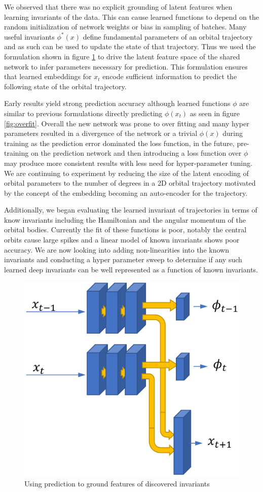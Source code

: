 \documentclass[10pt,letterpaper]{report}
\author{Brandon Houghton}
\begin{document}
We observed that there was no explicit grounding of latent features when learning invariants of the data. This can cause learned functions to depend on the random initialization of network weights or bias in sampling of batches. Many useful invariants $\phi^*(x)$ define fundamental parameters of an orbital trajectory and as such can be used to update the state of that trajectory. Thus we used the formulation shown in figure \ref{fig:prednetwork} to drive the latent feature space of the shared network to infer parameters necessary for prediction. This formulation ensures that learned embeddings for $x_t$ encode sufficient information to predict the following state of the orbital trajectory.

Early results yield strong prediction accuracy although learned functions $\phi$ are similar to previous formulations directly predicting $\phi (x_t)$ as seen in figure \ref{fig:overfit}. Overall the new network was prone to over fitting and many hyper parameters resulted in a divergence of the network or a trivial $\phi(x)$ during training as the prediction error dominated the loss function, in the future, pre-training on the prediction network and then introducing a loss function over $\phi$ may produce more consistent results with less need for hyper-parameter tuning. We are continuing to experiment by reducing the size of the latent encoding of orbital parameters to the number of degrees in a 2D orbital trajectory motivated by the concept of the embedding becoming an auto-encoder for the trajectory.

Additionally, we began evaluating the learned invariant of trajectories in terms of know invariants including the Hamiltonian and the angular momentum of the orbital bodies. Currently the fit of these functions is poor, notably the central orbits cause large spikes and a linear model of known invariants shows poor accuracy. We are now looking into adding non-linearities into the known invariants and conducting a hyper parameter sweep to determine if any such learned deep invariants can be well represented as a function of known invariants. 


\begin{figure}
	\centering
	\includegraphics[width=0.7\linewidth]{../images/predNetwork}
	\caption{Using prediction to ground features of discovered invariants}
	\label{fig:prednetwork}
\end{figure}
\end{document}
